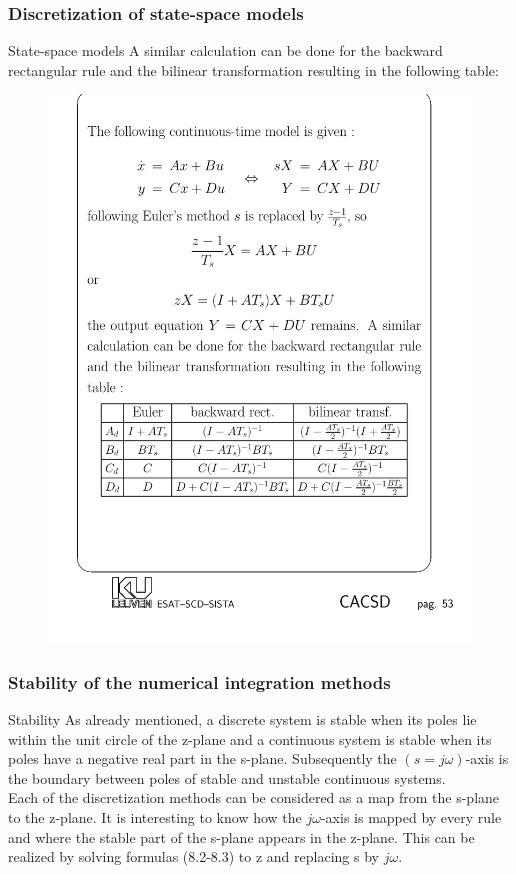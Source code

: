 \begin{frame}
	\frametitle{Discretization of state-space models}
	\begin{block}{State-space models}
		A similar calculation can be done for the backward rectangular rule and the bilinear transformation resulting in the following table:
		\begin{center}
			\begin{figure}
				\centering
				\includegraphics[width=1\linewidth]{Steady_State}
			\end{figure}
		\end{center}
	\end{block}
\end{frame}

\begin{frame}
	\frametitle{Stability of the numerical integration methods}
	\begin{block}{Stability}
		As already mentioned, a discrete system is stable when its poles lie within the unit circle of the z-plane and a continuous system is stable when its poles have a negative real part in the s-plane. Subsequently the $(s=j\omega)$-axis is the boundary between poles of stable and unstable continuous systems.\\
		\vspace{1em}
		Each of the discretization methods can be considered as a map from the s-plane to the z-plane. It is interesting to know how the $j\omega$-axis is mapped by every rule and where the stable part of the s-plane appears in the z-plane. This can be realized by solving formulas (8.2-8.3) to z and replacing s by $j\omega$. 
	\end{block}
\end{frame}

